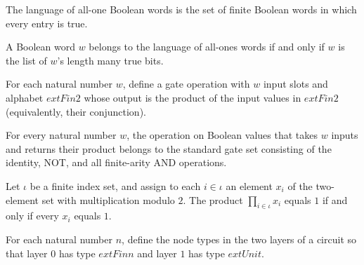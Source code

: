 \begin{definition}
\label{Language.allOnes}
\leanok
The language of all-one Boolean words is the set of finite Boolean words in which every
entry is true.
\end{definition}

\begin{theorem}
\label{Language.mem_allOnes_iff}
\leanok
{}
A Boolean word $w$ belongs to the language of all-ones words if and only if $w$ is the
list of $w$'s length many true bits.
\end{theorem}

\begin{definition}
\label{BoolCircuit.andGateOp}
\leanok
{}
For each natural number $w$, define a gate operation with $w$ input slots and alphabet
$	ext{Fin }2$ whose output is the product of the input values in $	ext{Fin }2$
(equivalently, their conjunction).
\end{definition}

\begin{theorem}
\label{BoolCircuit.andGateOp_mem_stdGateOps}
\leanok
{}
For every natural number $w$, the operation on Boolean values that takes $w$ inputs and
returns their product belongs to the standard gate set consisting of the identity, NOT,
and all finite-arity AND operations.
\end{theorem}

\begin{theorem}
\label{BoolCircuit.prod_fin_two_eq_one_iff}
\leanok
{}
Let $\iota$ be a finite index set, and assign to each $i\in\iota$ an element $x_i$ of
the two-element set with multiplication modulo $2$. The product $\prod_{i\in\iota}x_i$
equals $1$ if and only if every $x_i$ equals $1$.
\end{theorem}

\begin{definition}
\label{BoolCircuit.allOnesNodes}
\leanok
For each natural number $n$, define the node types in the two layers of a circuit so
that layer $0$ has type $	ext{Fin }n$ and layer $1$ has type $	ext{Unit}$.
\end{definition}

